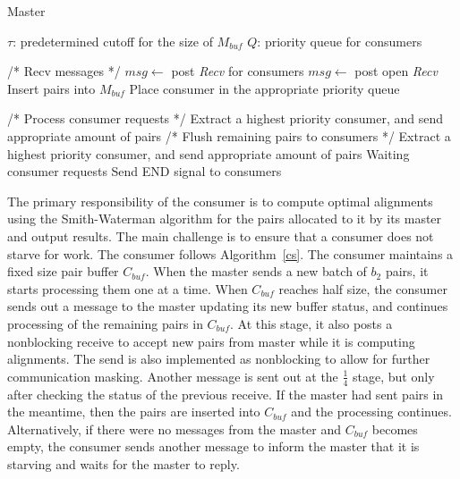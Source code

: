 \documentclass[10pt,journal,letterpaper,compsoc]{IEEEtran}
\begin{document}
\begin{algorithm}
\caption{Master}
\label{ms}
\begin{algorithmic}[1]

    \STATE $\tau$: predetermined cutoff for the size of $M_{buf}$
    \STATE $Q$: priority queue for consumers

    \WHILE{\TRUE}
        \STATE /* Recv messages */
            \STATE $msg\leftarrow$ post {\it Recv} for consumers
        \ELSE 
            \STATE $msg\leftarrow$ post open {\it Recv}
                \STATE Insert pairs into $M_{buf}$
                \ENDIF
                \STATE Place consumer in the appropriate priority queue
            \ENDIF
        \ENDIF
        
        \STATE /* Process consumer requests */
            \STATE Extract a highest priority consumer, and send appropriate amount of pairs
        \ENDWHILE
    \ENDWHILE
    \STATE /* Flush remaining pairs to consumers */
                \STATE Extract a highest priority consumer, and send appropriate amount of pairs
            \ELSE
                \STATE Waiting consumer requests
            \ENDIF
    \ENDWHILE
    \STATE Send END signal to consumers
\end{algorithmic}
\end{algorithm}



The primary responsibility of the consumer is to compute optimal alignments using the Smith-Waterman algorithm \cite{Smith81} for the pairs allocated to it by its master and output results. The main challenge is to ensure that a consumer does not starve for work. The consumer follows Algorithm~\ref{cs}. The consumer maintains a fixed size pair buffer $C_{buf}$. When the master sends a new batch of $b_2$ pairs, it starts processing them one at a time. When $C_{buf}$ reaches half size, the consumer sends out a message to the master updating its new buffer status, and continues processing of the remaining pairs in $C_{buf}$. At this stage, it also posts a nonblocking receive to accept new pairs from master while it is computing alignments. The send is also implemented as nonblocking to allow for further communication masking. Another message is sent out at the $\frac{1}{4}$ stage, but only after checking the status of the previous receive. If the master had sent pairs in the meantime, then the pairs are inserted into $C_{buf}$ and the processing continues. Alternatively, if there were no messages from the master and $C_{buf}$ becomes empty, the consumer sends another message to inform the master that it is starving and waits for the master to reply.
\end{document}
